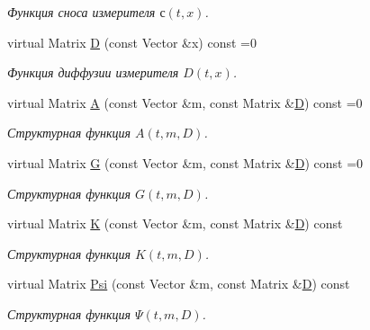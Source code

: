 \begin{DoxyCompactItemize}
\begin{DoxyCompactList}\small\item\em Функция сноса измерителя $с(t,x)$. \end{DoxyCompactList}\item 
virtual Matrix \hyperlink{class_core_1_1_continuous_task_ac792d0a5d2487a30f9eb360344675173}{D} (const Vector \&x) const =0\hypertarget{class_core_1_1_continuous_task_ac792d0a5d2487a30f9eb360344675173}{}\label{class_core_1_1_continuous_task_ac792d0a5d2487a30f9eb360344675173}

\begin{DoxyCompactList}\small\item\em Функция диффузии измерителя $D(t,x)$. \end{DoxyCompactList}\item 
virtual Matrix \hyperlink{class_core_1_1_continuous_task_a75fbac1abe67223cd7938b724c5cce45}{A} (const Vector \&m, const Matrix \&\hyperlink{class_core_1_1_continuous_task_ac792d0a5d2487a30f9eb360344675173}{D}) const =0
\begin{DoxyCompactList}\small\item\em Структурная функция $A(t, m, D)$. \end{DoxyCompactList}\item 
virtual Matrix \hyperlink{class_core_1_1_continuous_task_a1b579e183ffa229f97048aadfd834517}{G} (const Vector \&m, const Matrix \&\hyperlink{class_core_1_1_continuous_task_ac792d0a5d2487a30f9eb360344675173}{D}) const =0
\begin{DoxyCompactList}\small\item\em Структурная функция $G(t, m, D)$. \end{DoxyCompactList}\item 
virtual Matrix \hyperlink{class_core_1_1_continuous_task_ab0d1cc9a796ba69817f058bfbf5d9459}{K} (const Vector \&m, const Matrix \&\hyperlink{class_core_1_1_continuous_task_ac792d0a5d2487a30f9eb360344675173}{D}) const 
\begin{DoxyCompactList}\small\item\em Структурная функция $K(t, m, D)$. \end{DoxyCompactList}\item 
virtual Matrix \hyperlink{class_core_1_1_continuous_task_aafe93a5ca8d1b001d9bf1b5cd37f7899}{Psi} (const Vector \&m, const Matrix \&\hyperlink{class_core_1_1_continuous_task_ac792d0a5d2487a30f9eb360344675173}{D}) const 
\begin{DoxyCompactList}\small\item\em Структурная функция $\Psi(t, m, D)$. \end{DoxyCompactList}\end{DoxyCompactItemize}
